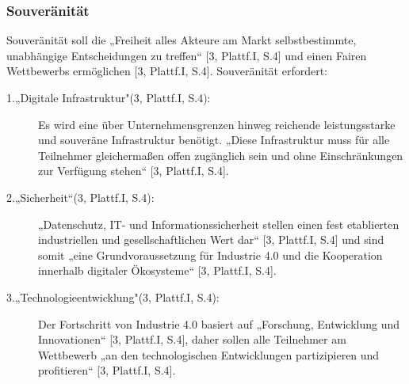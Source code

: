 \subsubsection{Souveränität}\label{sec:Souveränität}
Souveränität soll die „Freiheit alles Akteure am Markt selbstbestimmte, unabhängige Entscheidungen zu treffen“ [3, Plattf.I, S.4] und einen Fairen Wettbewerbs ermöglichen [3, Plattf.I, S.4]. Souveränität erfordert:
\begin{description}
	\item[1.„Digitale Infrastruktur"(3, Plattf.I, S.4):]
	
	Es wird eine über Unternehmensgrenzen hinweg reichende leistungsstarke und souveräne
	Infrastruktur benötigt. „Diese Infrastruktur muss für alle Teilnehmer gleichermaßen offen 
	zugänglich sein und ohne Einschränkungen zur Verfügung stehen“ [3, Plattf.I, S.4].
	
	\item[2.„Sicherheit“(3, Plattf.I, S.4):]
	
	„Datenschutz, IT- und Informationssicherheit stellen einen fest etablierten industriellen
	und gesellschaftlichen Wert dar“ [3, Plattf.I, S.4] und sind somit „eine Grundvoraussetzung
	für Industrie 4.0 und die Kooperation innerhalb digitaler Ökosysteme“ [3, Plattf.I, S.4].
	
	\item[3.„Technologieentwicklung"(3, Plattf.I, S.4):]
	
	Der Fortschritt von Industrie 4.0 basiert auf „Forschung, Entwicklung und Innovationen“ 
	[3, Plattf.I, S.4], daher sollen alle Teilnehmer am Wettbewerb „an den technologischen 
	Entwicklungen partizipieren und profitieren“ [3, Plattf.I, S.4].
\end{description}

